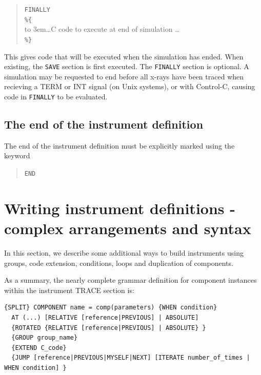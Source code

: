 \begin{quote}
  \texttt{FINALLY} \\
  \verb|%{| \\
  \hbox to 3em{}\ldots C code to execute at end of simulation \ldots \\
  \verb|%}|
\end{quote}
This gives code that will be executed when the simulation has
ended. When existing, the \texttt{SAVE} section is first executed. The
\texttt{FINALLY} section is optional.
A simulation may be requested to end before all x-rays have been
traced when recieving a TERM or INT signal (on Unix systems), or with
Control-C, causing code in \texttt{FINALLY} to be evaluated.
 


\subsection{The end of the instrument definition}
\label{s:end}

The end of the instrument definition must be explicitly marked using the keyword
\begin{quote}
  \texttt{END}
\end{quote}




\section{Writing instrument definitions - complex arrangements and syntax}
\label{s:instrdefs-complex}

In this section, we describe some additional ways to build instruments using groups, code extension, conditions, loops and duplication of components.

As a summary, the nearly complete grammar definition for component instances within the instrument TRACE section is:

\begin{verbatim}
{SPLIT} COMPONENT name = comp(parameters) {WHEN condition}
  AT (...) [RELATIVE [reference|PREVIOUS] | ABSOLUTE]
  {ROTATED {RELATIVE [reference|PREVIOUS] | ABSOLUTE} }
  {GROUP group_name}
  {EXTEND C_code}
  {JUMP [reference|PREVIOUS|MYSELF|NEXT] [ITERATE number_of_times | WHEN condition] }
\end{verbatim}

